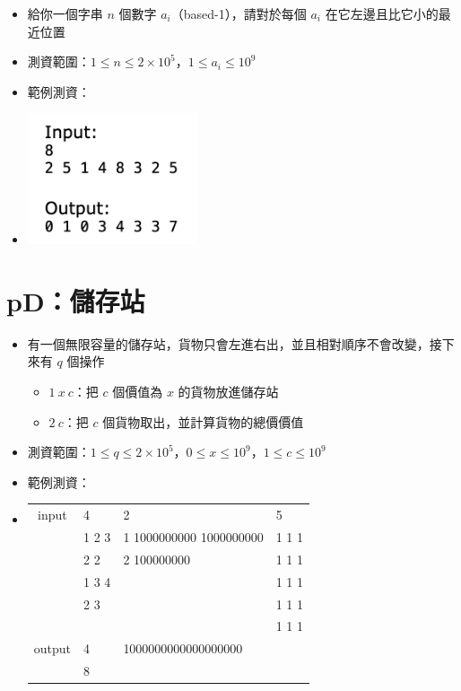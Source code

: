 \documentclass[12pt]{article}
\begin{document}
\begin{itemize}[label={}, itemsep=0pt]
    \item 給你一個字串 $n$ 個數字 $a_i$（based-1），請對於每個 $a_i$ 在它左邊且比它小的最近位置
    \item 測資範圍：$1 \leq n \leq 2 \times 10^5$，$1 \leq a_i \leq 10^9$
    \item 範例測資：
    \item \includegraphics[width=5.0cm]{img/pC}
\end{itemize}

\pagebreak

\section*{pD：儲存站}

\begin{itemize}[label={}, itemsep=0pt]
    \item 有一個無限容量的儲存站，貨物只會左進右出，並且相對順序不會改變，接下來有 $q$ 個操作
    \begin{itemize}[label={-}, itemsep=0pt]
        \item $1\ x\ c$：把 $c$ 個價值為 $x$ 的貨物放進儲存站
        \item $2\ c$：把 $c$ 個貨物取出，並計算貨物的總價價值
    \end{itemize}
    \item 測資範圍：$1 \leq q \leq 2 \times 10^5$，$0 \leq x \leq 10^9$，$1 \leq c \leq 10^9$
    \item 範例測資：
    \item
    \centering
    \begin{tabular}{|l|l|l|l|}
        \hline
        \multicolumn{1}{|c|}{input}  & 4     & 2                       & 5     \\
                                     & 1 2 3 & 1 1000000000 1000000000 & 1 1 1 \\
                                     & 2 2   & 2 100000000             & 1 1 1 \\
                                     & 1 3 4 &                         & 1 1 1 \\
                                     & 2 3   &                         & 1 1 1 \\
                                     &       &                         & 1 1 1 \\ \hline
        \multicolumn{1}{|c|}{output} & 4     & 1000000000000000000     &       \\
                                     & 8     &                         &       \\ \hline
    \end{tabular}
\end{itemize}
\end{document}
